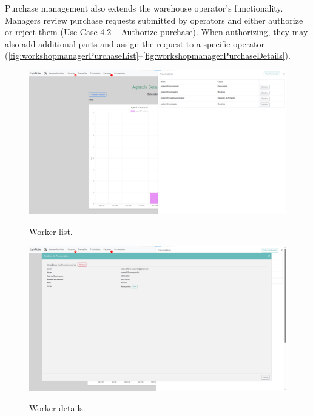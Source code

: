 Purchase management also extends the warehouse operator's functionality. Managers review purchase requests submitted by operators and either authorize or reject them (Use Case 4.2 – Authorize purchase). When authorizing, they may also add additional parts and assign the request to a specific operator (\ref{fig:workshopmanagerPurchaseList}–\ref{fig:workshopmanagerPurchaseDetails}).


\begin{figure}[h]
  \caption{Worker list.}
  \centering
  \includegraphics[width=\textwidth]{figs/Implementation/workshopmanager/workerList}
  \label{fig:workerList}
\end{figure}


\begin{figure}[h]
  \caption{Worker details.}
  \centering
  \includegraphics[width=\textwidth]{figs/Implementation/workshopmanager/workerDetails}
  \label{fig:workerDetails}
\end{figure}



